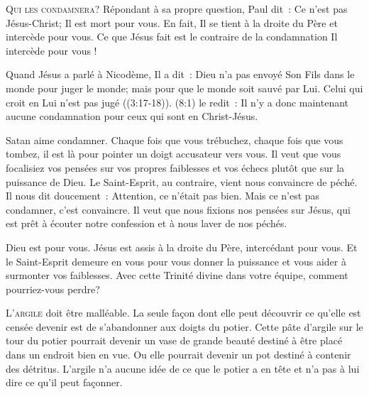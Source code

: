 \lettrine[ante=\Og]{Q}{ui les condamnera?} \Fg{}
 Répondant à sa propre question, Paul dit~: 
 \Og Ce n'est pas Jésus-Christ; Il est mort pour vous.
 En fait, Il se tient à la droite du Père et intercède pour vous. \Fg{}
 Ce que Jésus fait est le contraire de la condamnation
 \ocadr Il intercède pour vous !

Quand Jésus a parlé à Nicodème, Il a dit~: 
 \Og Dieu n'a pas envoyé Son Fils dans le monde pour juger le monde;
 mais pour que le monde soit sauvé par Lui. Celui qui croit en Lui
 n'est pas jugé \Fg{} ((3:17-18)).
 (8:1) le redit~: 
 \Og Il n'y a donc maintenant aucune condamnation
 pour ceux qui sont en Christ-Jésus. \Fg{}


Satan aime condamner. Chaque fois que vous trébuchez,
 chaque fois que vous tombez, il est là pour pointer un doigt accusateur
 vers vous. Il veut que vous focalisiez vos pensées sur vos propres faiblesses
 et vos échecs plutôt que sur la puissance de Dieu.
 Le Saint-Esprit, au contraire, vient nous convaincre de péché.
 Il nous dit doucement~: 
 \Og Attention, ce n'était pas bien. \Fg{}
 Mais ce n'est pas condamner, c'est convaincre.
 Il veut que nous fixions nos pensées sur Jésus,
 qui est prêt à écouter notre confession et à nous laver de nos péchés.

Dieu est pour vous. Jésus est assis à la droite du Père,
 intercédant pour vous. Et le Saint-Esprit demeure en vous
 pour vous donner la puissance et vous aider à surmonter vos faiblesses.
 Avec cette Trinité divine dans 
 votre équipe, comment pourriez-vous perdre?

\dvrule






\lettrine{L}{'argile} doit être malléable.
 La seule fa\c{c}on dont elle peut découvrir ce qu'elle est censée devenir
 est de s'abandonner aux doigts du potier.
 Cette pâte d'argile sur le tour du potier pourrait devenir
 un vase de grande beauté destiné à être placé dans un endroit
 bien en vue. Ou elle pourrait devenir un pot destiné à contenir
 des détritus. L'argile n'a aucune idée de ce que le potier
 a en tête et n'a pas à lui dire ce qu'il peut fa\c{c}onner.

